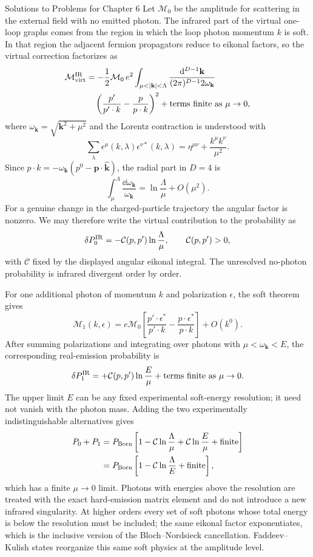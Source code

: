 \begin{bankssolutions}{Solutions to Problems for Chapter 6}
Let $\mathcal M_0$ be the amplitude for scattering in the external field
with no emitted photon.  The infrared part of the virtual one-loop graphs
comes from the region in which the loop photon momentum $k$ is soft.  In
that region the adjacent fermion propagators reduce to eikonal factors, so
the virtual correction factorizes as
\begin{align*}
 \mathcal M_{\rm virt}^{\rm IR}
 &=-\frac12\mathcal M_0\,e^2
 \int_{\mu<|\mathbf k|<\Lambda}\frac{\dd^{D-1}\mathbf k}
 {(2\pi)^{D-1} 2\omega_{\mathbf k}}\\
 &\quad\left(\frac{p'}{p'\cdot k}-\frac{p}{p\cdot k}\right)^2
 +\text{terms finite as }\mu\to0,
\end{align*}
where $\omega_{\mathbf k}=\sqrt{\mathbf k^2+\mu^2}$ and the Lorentz contraction is
understood with
\[
 \sum_\lambda\epsilon^\mu(k,\lambda)\epsilon^{\nu*}(k,\lambda)
 =\eta^{\mu\nu}+\frac{k^\mu k^\nu}{\mu^2}.
\]
Since
$p\cdot k=-\omega_{\mathbf k}(p^0-\mathbf p\cdot\widehat{\mathbf k})$, the
radial part in \(D=4\) is
\[
 \int_{\mu}^{\Lambda}\frac{\dd\omega_{\mathbf k}}{\omega_{\mathbf k}}
 =\ln\frac{\Lambda}{\mu}+O(\mu^2).
\]
For a genuine change in the charged-particle trajectory the angular factor
is nonzero.  We may therefore write the virtual contribution to the
probability as
\[
 \delta P_0^{\rm IR}=-\mathcal C(p,p')\ln\frac{\Lambda}{\mu},
 \qquad \mathcal C(p,p')>0,
\]
with $\mathcal C$ fixed by the displayed angular eikonal integral.  The
unresolved no-photon probability is infrared divergent order by order.

For one additional photon of momentum $k$ and polarization $\epsilon$, the
soft theorem gives
\begin{equation*}
 \mathcal M_1(k,\epsilon)
 =e\mathcal M_0\left[
 \frac{p'\cdot\epsilon^*}{p'\cdot k}
 -\frac{p\cdot\epsilon^*}{p\cdot k}\right]
 +O(k^0).
\end{equation*}
After summing polarizations and integrating over photons with
$\mu<\omega_{\mathbf k}<E$, the corresponding real-emission probability is
\[
 \delta P_1^{\rm IR}=+\mathcal C(p,p')\ln\frac{E}{\mu}
 +\text{terms finite as }\mu\to0.
\]
The upper limit $E$ can be any fixed experimental soft-energy resolution;
it need not vanish with the photon mass.  Adding the two experimentally
indistinguishable alternatives gives
\begin{align*}
 P_0+P_1
 &=P_{\rm Born}\left[1-\mathcal C\ln\frac{\Lambda}{\mu}
 +\mathcal C\ln\frac{E}{\mu}+\text{finite}\right]\\
 &=P_{\rm Born}\left[1-\mathcal C\ln\frac{\Lambda}{E}
 +\text{finite}\right],
\end{align*}
which has a finite $\mu\to0$ limit.  Photons with energies above the
resolution are treated with the exact hard-emission matrix element and do
not introduce a new infrared singularity.  At higher orders every set of
soft photons whose total energy is below the resolution must be included;
the same eikonal factor exponentiates, which is the inclusive version of
the Bloch--Nordsieck cancellation.  Faddeev--Kulish states reorganize this
same soft physics at the amplitude level.

\end{bankssolutions}
